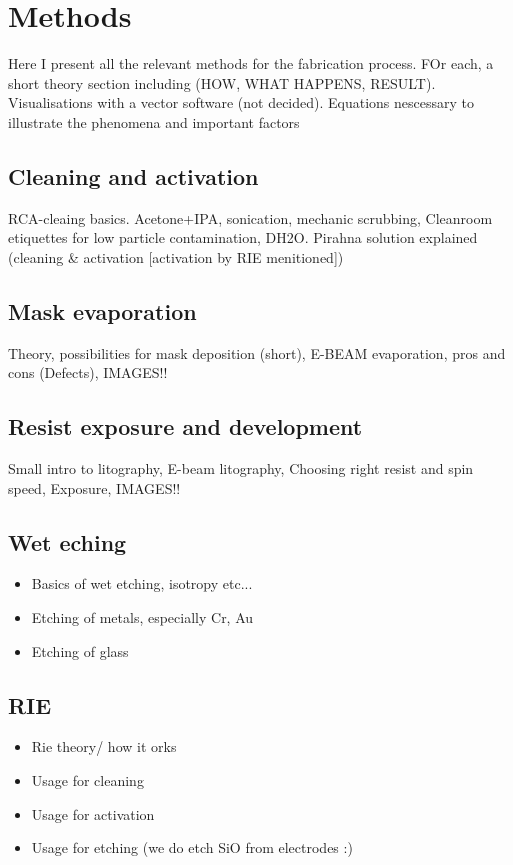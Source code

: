 \documentclass[final]{jyflluk}
\begin{document}


\section{Methods}
\label{sec:methods}

Here I present all the relevant methods for the fabrication process. FOr each, a short theory section including (HOW, WHAT HAPPENS, RESULT). Visualisations with a vector software (not decided). Equations  nescessary to illustrate the phenomena and important factors

\subsection{Cleaning and activation}
\label{sec:xx1}
RCA-cleaing basics. Acetone+IPA, sonication, mechanic scrubbing, Cleanroom etiquettes for low particle contamination,
DH2O. Pirahna solution explained (cleaning \& activation [activation by RIE menitioned])

\subsection{Mask evaporation}
\label{sec:xx2}
Theory, possibilities for mask deposition (short), E-BEAM evaporation, pros and cons (Defects), IMAGES!!

\subsection{Resist exposure and development}
\label{sec:xx3}
Small intro to litography, E-beam litography, Choosing right resist and spin speed, Exposure, IMAGES!!

\subsection{Wet eching}
\label{sec:xx4}
\begin{itemize}
    \item Basics of wet etching, isotropy etc...
    \item Etching of metals, especially Cr, Au
    \item Etching of glass
\end{itemize}


\label{sec:xx5}
\subsection{RIE}
\begin{itemize}
    \item Rie theory/ how it orks
    \item Usage for cleaning
    \item Usage for activation
    \item Usage for etching (we do etch SiO from electrodes :)
\end{itemize}
\end{document}
